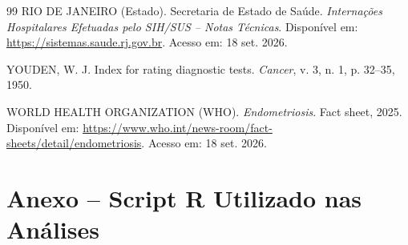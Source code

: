 \documentclass[12pt,a4paper]{article}
\begin{document}
\begin{thebibliography}{99}
 RIO DE JANEIRO (Estado). Secretaria de Estado de Saúde. \textit{Internações Hospitalares Efetuadas pelo SIH/SUS -- Notas Técnicas}. Disponível em: \url{https://sistemas.saude.rj.gov.br}. Acesso em: 18 set. 2026.

 YOUDEN, W. J. Index for rating diagnostic tests. \textit{Cancer}, v. 3, n. 1, p. 32--35, 1950.

 WORLD HEALTH ORGANIZATION (WHO). \textit{Endometriosis}. Fact sheet, 2025. Disponível em: \url{https://www.who.int/news-room/fact-sheets/detail/endometriosis}. Acesso em: 18 set. 2026.

\end{thebibliography}

\addtocounter{section}{1}
\section{Anexo -- Script R Utilizado nas Análises}
\end{document}
